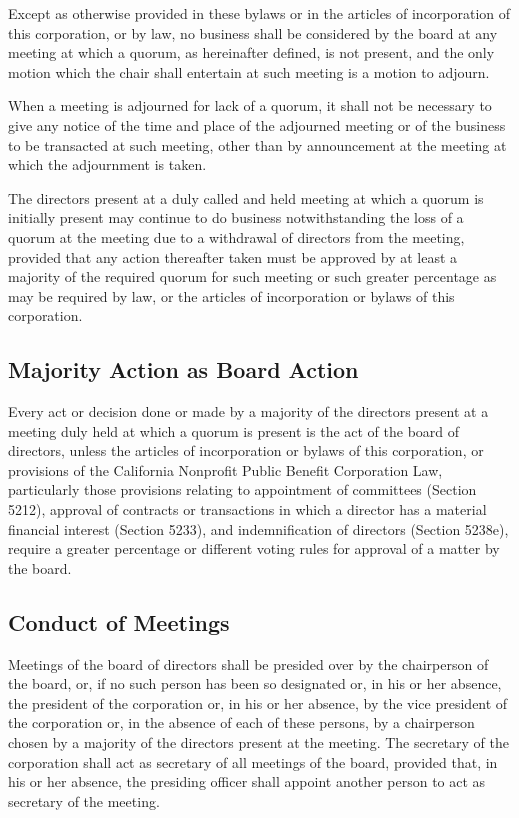 \documentclass{article}
\begin{document}
	Except as otherwise provided in these bylaws or in the articles of incorporation of this corporation, or by law, no business shall be considered by the board at any meeting at which a quorum, as hereinafter defined, is not present, and the only motion which the chair shall entertain at such meeting is a motion to adjourn.
	
	When a meeting is adjourned for lack of a quorum, it shall not be necessary to give any notice of the time and place of the adjourned meeting or of the business to be transacted at such meeting, other than by announcement at the meeting at which the adjournment is taken. %
	
	The directors present at a duly called and held meeting at which a quorum is initially present may continue to do business notwithstanding the loss of a quorum at the meeting due to a withdrawal of directors from the meeting, provided that any action thereafter taken must be approved by at least a majority of the required quorum for such meeting or such greater percentage as may be required by law, or the articles of incorporation or bylaws of this corporation.
	
	\subsection{Majority Action as Board Action}
	Every act or decision done or made by a majority of the directors present at a meeting duly held at which a quorum is present is the act of the board of directors, unless the articles of incorporation or bylaws of this corporation, or provisions of the California Nonprofit Public Benefit Corporation Law, particularly those provisions relating to appointment of committees (Section 5212), approval of contracts or transactions in which a director has a material financial interest (Section 5233), and indemnification of directors (Section 5238e), require a greater percentage or different voting rules for approval of a matter by the board.
	
	\subsection{Conduct of Meetings}
	Meetings of the board of directors shall be presided over by the chairperson of the board, or, if no such person has been so designated or, in his or her absence, the president of the corporation or, in his or her absence, by the vice president of the corporation or, in the absence of each of these persons, by a chairperson chosen by a majority of the directors present at the meeting. The secretary of the corporation shall act as secretary of all meetings of the board, provided that, in his or her absence, the presiding officer shall appoint another person to act as secretary of the meeting.
	
\end{document}
